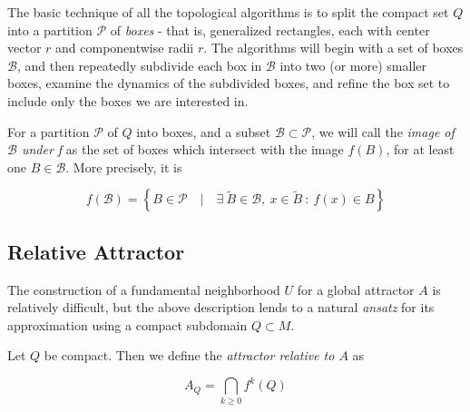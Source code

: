 
The basic technique of all the topological algorithms is to split the compact set $Q$ into 
a partition $\mathcal{P}$ of \emph{boxes} - that is, generalized rectangles, each with 
center vector $r$ and componentwise radii $r$. The algorithms will begin with a set of boxes 
$\mathcal{B}$, and then repeatedly subdivide each box in $\mathcal{B}$ into two (or more) 
smaller boxes, examine the dynamics of the subdivided boxes, and refine the box set to 
include only the boxes we are interested in. \\

\begin{definition}
    For a partition $\mathcal{P}$ of $Q$ into boxes, and a subset 
    $\mathcal{B} \subset \mathcal{P}$, we will call the \emph{image of $\mathcal{B}$ under f}
    as the set of boxes which intersect with the image $f(B)$, for at least one 
    $B \in \mathcal{B}$. More precisely, it is
    
    \begin{equation}
        f (\mathcal{B}) = \left\{
            B \in \mathcal{P} \quad \vert \quad 
            \exists\ \tilde{B} \in \mathcal{B},\ x \in \tilde{B}\ :\ 
            f(x) \in B 
        \right\}
    \end{equation}


\end{definition}

\subsection{Relative Attractor}

The construction of a fundamental neighborhood $U$ for a global attractor $A$ is
relatively difficult, but the above description lends to a natural \emph{ansatz} for its 
approximation using a compact subdomain $Q \subset M$. \\

\begin{definition}
    Let $Q$ be compact. Then we define the \emph{attractor relative to $A$} as

    \begin{equation}
        A_Q = \bigcap\limits_{k \geq 0} f^k (Q)
    \end{equation}

\end{definition}

